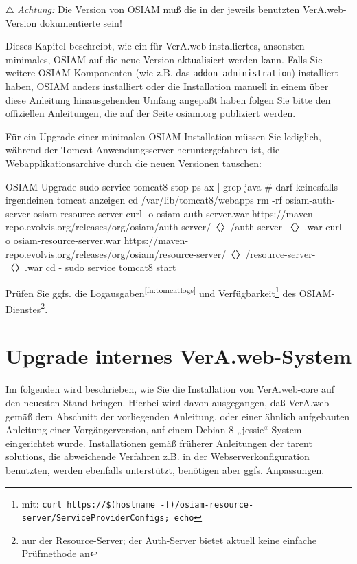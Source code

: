 ⚠ \emph{Achtung:} Die Version von OSIAM muß die in der jeweils
benutzten VerA.web-Version dokumentierte sein!

Dieses Kapitel beschreibt, wie ein für VerA.web installiertes,
ansonsten minimales, OSIAM auf die neue Version aktualisiert
werden kann. Falls Sie weitere OSIAM-Komponenten (wie z.B.
das \texttt{addon-administration}) installiert haben, OSIAM
anders installiert oder die Installation manuell in einem
über diese Anleitung hinausgehenden Umfang angepaßt haben
folgen Sie bitte den offiziellen Anleitungen, die auf der
Seite \href{http://osiam.org/}{osiam.org} publiziert werden.

\begin{minipage}{\linewidth}
Für ein Upgrade einer minimalen OSIAM-Installation müssen Sie
lediglich, während der Tomcat-Anwendungsserver heruntergefahren
ist, die Webapplikationsarchive durch die neuen Versionen tauschen:

\begin{lstdump}{OSIAM Upgrade}
sudo service tomcat8 stop
ps ax | grep java # darf keinesfalls irgendeinen tomcat anzeigen
cd /var/lib/tomcat8/webapps
rm -rf osiam-auth-server osiam-resource-server
curl -o osiam-auth-server.war https://maven-repo.evolvis.org/releases/org/osiam/auth-server/〈\lstdumpesc{\vwiaversosiam}〉/auth-server-〈\lstdumpesc{\vwiaversosiam}〉.war
curl -o osiam-resource-server.war https://maven-repo.evolvis.org/releases/org/osiam/resource-server/〈\lstdumpesc{\vwiaversosiam}〉/resource-server-〈\lstdumpesc{\vwiaversosiam}〉.war
cd -
sudo service tomcat8 start
\end{lstdump}
\end{minipage}

Prüfen Sie ggfs. die Logausgaben\Hair\textsuperscript{\ref{fn:tomcatlogs}}
und Verfügbarkeit\Hair\footnote{\label{fn:osiamcheck}mit:
\texttt{curl https://\$(hostname -f)/osiam-resource-server/ServiceProviderConfigs; echo}%
} des OSIAM-Dienstes\Hair\footnote{\label{fn:osiamsvcchk}nur der
Resource-Server; der Auth-Server bietet aktuell keine einfache Prüfmethode an}.

\fi%

\section{Upgrade internes VerA.web-System}\label{sec:upgrade-int}

Im folgenden wird beschrieben, wie Sie die Installation von
VerA.web-core auf den neuesten Stand bringen.
Hierbei wird davon ausgegangen, daß VerA.web gemäß
  dem Abschnitt  der vorliegenden Anleitung,
  oder einer ähnlich aufgebauten Anleitung einer Vorgängerversion,
auf einem Debian 8 „jessie“-System eingerichtet
wurde. Installationen gemäß früherer Anleitungen der tarent solutions,
die abweichende Verfahren z.B. in der Webserverkonfiguration benutzten,
werden ebenfalls unterstützt, benötigen aber ggfs. Anpassungen.


